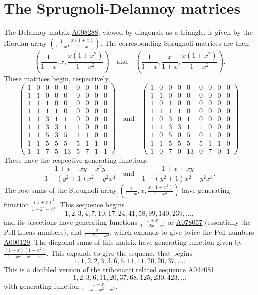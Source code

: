 \documentclass[12pt,reqno]{article}
\theoremstyle{definition}
\newcommand{\seqnum}[1]{\href{http://oeis.org/#1}{\underline{#1}}}
\begin{document}
\section{The Sprugnoli-Delannoy matrices}
The Delannoy matrix \seqnum{A008288}, viewed by diagonals as a triangle, is given by the Riordan array $\left(\frac{1}{1-x}, \frac{x(1+x)}{1-x}\right)$. The corresponding Sprugnoli matrices are then $$\left(\frac{1}{1-x}, x, \frac{x(1+x^2)}{1-x^2}\right)\quad\text{and}\quad \left(\frac{1}{1-x}, \frac{x}{1+x}, \frac{x(1+x^2)}{1-x^2}\right).$$
These matrices begin, respectively,
$$\left(\begin{array}{cccccccccc}
1 & 0 & 0 & 0 & 0 & 0 & 0 & 0 & 0 \\
1 & 1 & 0 & 0 & 0 & 0 & 0 & 0 & 0 \\
1 & 1 & 1 & 0 & 0 & 0 & 0 & 0 & 0 \\
1 & 1 & 1 & 1 & 0 & 0 & 0 & 0 & 0 \\
1 & 1 & 3 & 1 & 1 & 0 & 0 & 0 & 0 \\
1 & 1 & 3 & 3 & 1 & 1 & 0 & 0 & 0 \\
1 & 1 & 5 & 3 & 5 & 1 & 1 & 0 & 0 \\
1 & 1 & 5 & 5 & 5 & 5 & 1 & 1 & 0 \\
1 & 1 & 7 & 5 & 13 & 5 & 7 & 1 & 1
\end{array}\right)\quad\text{and}\quad\left(\begin{array}{cccccccccc} 1 & 0 & 0 & 0 & 0 & 0 & 0 & 0 & 0 \\
1 & 1 & 0 & 0 & 0 & 0 & 0 & 0 & 0 \\
1 & 0 & 1 & 0 & 0 & 0 & 0 & 0 & 0 \\
1 & 1 & 1 & 1 & 0 & 0 & 0 & 0 & 0 \\
1 & 0 & 3 & 0 & 1 & 0 & 0 & 0 & 0 \\
1 & 1 & 3 & 3 & 1 & 1 & 0 & 0 & 0 \\
1 & 0 & 5 & 0 & 5 & 0 & 1 & 0 & 0 \\
1 & 1 & 5 & 5 & 5 & 5 & 1 & 1 & 0 \\
1 & 0 & 7 & 0 & 13 & 0 & 7 & 0 & 1\end{array}\right).
$$
These have the respective generating functions
$$\frac{1+x+xy+x^2y}{1-(y^2+1)x^2-y^2x^4} \quad\text{and}\quad \frac{1+x+xy}{1-(y^2+1)x^2-y^2x^4}.$$
The row sums of the Sprugnoli array $\left(\frac{1}{1-x}, x, \frac{x(1+x^2)}{1-x^2}\right)$ have generating function
$\frac{(1+x)^2}{1-2^2-x^4}$. This sequence begins
$$1, 2, 3, 4, 7, 10, 17, 24, 41, 58, 99, 140, 239,\ldots,$$ and its bisections have generating functions
$\frac{1+x}{1-2x-x^2}$ or \seqnum{A078057} (essentially the Pell-Lucas numbers), and $\frac{2}{1-2x-x^2}$, which expands to give twice the Pell numbers \seqnum{A000129}. The diagonal sums of this matrix have generating function given by $\frac{(1+x)(1+x^2)}{1-x^2-x^4-x^6}$. This expands to give the sequence that begins
$$1, 1, 2, 2, 3, 3, 6, 6, 11, 11, 20, 20, 37,\ldots.$$ This is a doubled version of the tribonacci related sequence \seqnum{A047081}
$$1, 2, 3, 6, 11, 20, 37, 68, 125, 230, 423,\ldots$$ with generating function $\frac{1+x}{1-x-x^2-x^3}$.
\end{document}
